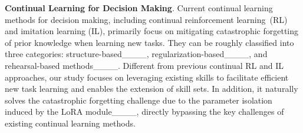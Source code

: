 \textbf{Continual Learning for Decision Making}.
Current continual learning methods for decision making, including continual reinforcement learning~(RL) and imitation learning (IL), primarily focus on mitigating catastrophic forgetting of prior knowledge when learning new tasks. They can be roughly classified into three categories: structure-based____,  regularization-based____, and rehearsal-based methods____. Different from previous continual RL and IL approaches, our study focuses on leveraging existing skills to facilitate efficient new task learning and enables the extension of skill sets. In addition, it naturally solves the catastrophic forgetting challenge due to the parameter isolation induced by the LoRA module____, directly bypassing the key challenges of existing continual learning methods. 





\vspace{-8pt}